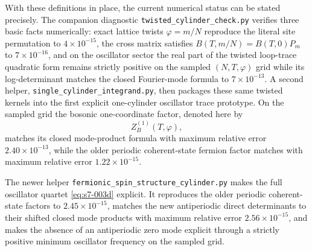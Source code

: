 \documentclass[11pt]{article}
\numberwithin{equation}{section}
\begin{document}
With these definitions in place, the current numerical status can be stated precisely. The companion diagnostic \texttt{twisted\_cylinder\_check.py} verifies three basic facts numerically: exact lattice twists $\varphi=m/N$ reproduce the literal site permutation to $4\times 10^{-15}$, the cross matrix satisfies $B(T,m/N)=B(T,0)P_m$ to $7\times 10^{-16}$, and on the oscillator sector the real part of the twisted loop-trace quadratic form remains strictly positive on the sampled $(N,T,\varphi)$ grid while its log-determinant matches the closed Fourier-mode formula to $7\times 10^{-13}$. A second helper, \texttt{single\_cylinder\_integrand.py}, then packages these same twisted kernels into the first explicit one-cylinder oscillator trace prototype. On the sampled grid the bosonic one-coordinate factor, denoted here by
\[
Z_B^{(1)}(T,\varphi),
\]
matches its closed mode-product formula with maximum relative error $2.40\times 10^{-13}$, while the older periodic coherent-state fermion factor matches with maximum relative error $1.22\times 10^{-15}$.

The newer helper \texttt{fermionic\_spin\_structure\_cylinder.py} makes the full oscillator quartet \eqref{eq:s7-003d} explicit. It reproduces the older periodic coherent-state factors to $2.45\times 10^{-15}$, matches the new antiperiodic direct determinants to their shifted closed mode products with maximum relative error $2.56\times 10^{-15}$, and makes the absence of an antiperiodic zero mode explicit through a strictly positive minimum oscillator frequency on the sampled grid.
\end{document}
